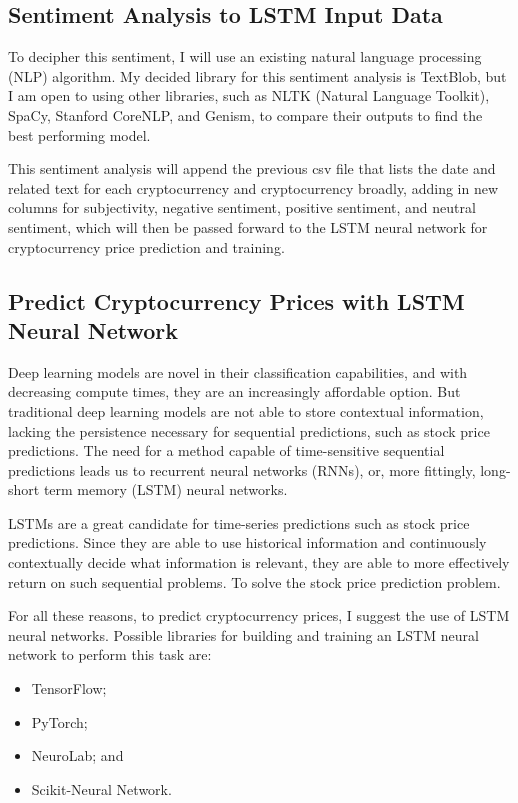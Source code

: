\documentclass[10pt,twocolumn]{article}
\begin{document}
\subsection{Sentiment Analysis to LSTM Input Data}

To decipher this sentiment, I will use an existing natural language processing (NLP) algorithm. My decided library for this sentiment analysis is TextBlob, but I am open to using other libraries, such as NLTK (Natural Language Toolkit), SpaCy, Stanford CoreNLP, and Genism, to compare their outputs to find the best performing model.

This sentiment analysis will append the previous csv file that lists the date and related text for each cryptocurrency and cryptocurrency broadly, adding in new columns for subjectivity, negative sentiment, positive sentiment, and neutral sentiment, which will then be passed forward to the LSTM neural network for cryptocurrency price prediction and training.

\subsection{Predict Cryptocurrency Prices with LSTM Neural Network}

Deep learning models are novel in their classification capabilities, and with decreasing compute times, they are an increasingly affordable option. But traditional deep learning models are not able to store contextual information, lacking the persistence necessary for sequential predictions, such as stock price predictions. The need for a method capable of time-sensitive sequential predictions leads us to recurrent neural networks (RNNs), or, more fittingly, long-short term memory (LSTM) neural networks.

LSTMs are a great candidate for time-series predictions such as stock price predictions. Since they are able to use historical information and continuously contextually decide what information is relevant, they are able to more effectively return on such sequential problems. To solve the stock price prediction problem.

For all these reasons, to predict cryptocurrency prices, I suggest the use of LSTM neural networks. Possible libraries for building and training an LSTM neural network to perform this task are:

\begin{itemize}
    \item TensorFlow;
    \item PyTorch;
    \item NeuroLab; and
    \item Scikit-Neural Network.
\end{itemize}
\end{document}
